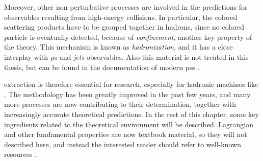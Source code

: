 Moreover, other non-perturbative processes are involved in the predictions for
observables resulting from high-energy collisions.
In particular, the colored scattering products have to be grouped together in
hadrons, since no colored particle is eventually detected, because of \qcd
\textit{confinement}, another key property of the theory.
%
This mechanism is known as \textit{hadronization}, and it has a close interplay
with \acrfull{ps} and \qcd \textit{jets} observables.
%
Also this material is not treated in this thesis, but can be found in the
documentation of modern \acrlong{ps}s \cite{Bierlich:2022pfr,Bellm:2015jjp}.

\pdfs extraction is therefore essential for \hep research, especially for
hadronic machines like \lhc.
The methodology has been greatly improved in the past few years, and many more
processes are now contributing to their determination, together with
increasingly accurate theoretical predictions.
%
In the rest of this chapter, some key ingredients related to the \pdf
theoretical environment will be described.
\qcd Lagrangian and other fundamental properties are now textbook material, so
they will not described here, and instead the interested reader should refer to
well-known resources
\cite{Peskin:1995ev,Ellis:1996mzs,Campbell:2017hsr,Collins:2011zzd}.

